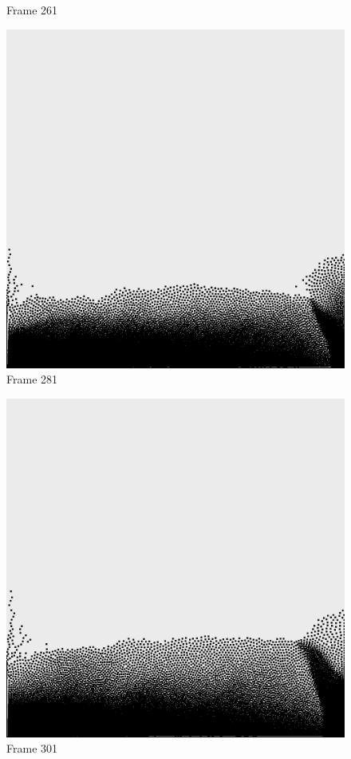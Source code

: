 \documentclass[a4paper, 12pt, oneside]{book}
\begin{document}
\begin{figure}[!ht]
\begin{center}
            Frame 261
        \end{center}
    \endminipage
    \hfill
        \begin{center}
            \includegraphics[width=\linewidth]{images/test_case_2/281.png}
            Frame 281
        \end{center}
    \endminipage
    \hfill
        \begin{center}
            \includegraphics[width=\linewidth]{images/test_case_2/301.png}
            Frame 301
        \end{center}
    \endminipage
    \hfill


\end{figure}
\end{document}
